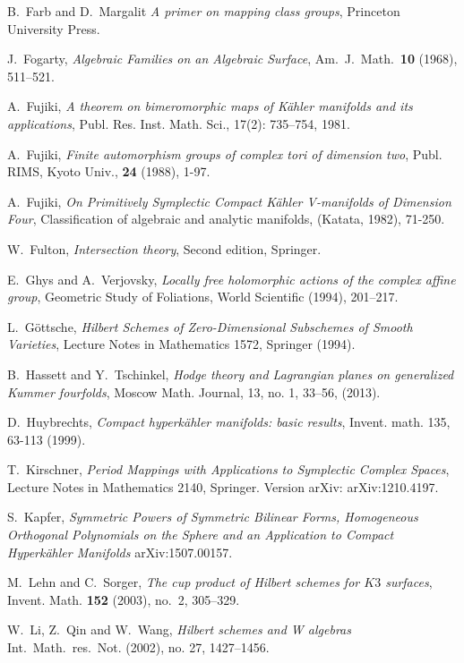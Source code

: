 \begin{thebibliography}{10}
B.~Farb and D.~Margalit \emph{A primer on mapping class groups}, Princeton University Press.

J.~Fogarty, \emph{Algebraic Families on an Algebraic Surface},
  Am.~J.~Math.~\textbf{10} (1968), 511--521.

A.~Fujiki,
\emph{A theorem on bimeromorphic maps of K\"ahler manifolds and its applications},
Publ. Res. Inst. Math. Sci., 
17(2): 735--754, 1981.

A.~Fujiki, \emph{Finite automorphism groups of complex tori of dimension two}, Publ. RIMS,
  Kyoto Univ., \textbf{24} (1988), 1-97.

A.~Fujiki,
\emph{On Primitively Symplectic Compact K\"ahler V-manifolds of Dimension Four},
Classification of algebraic and analytic manifolds, 
(Katata, 1982), 71-250.

W.~Fulton,
\emph{Intersection theory},
Second edition, Springer.

E.~Ghys and A.~Verjovsky, \emph{Locally free holomorphic actions of the complex affine group},
  Geometric Study of Foliations, World Scientific (1994), 201--217.

L.~G\"ottsche, \emph{Hilbert Schemes of Zero-Dimensional Subschemes of Smooth Varieties},
  Lecture Notes in Mathematics 1572, Springer (1994).

B.~Hassett and Y.~Tschinkel, \emph{ Hodge theory and Lagrangian planes on 
  generalized Kummer fourfolds}, Moscow Math. Journal, 13, no. 1, 33--56, (2013).

D.~Huybrechts,
\emph{ Compact hyperk\"ahler manifolds: basic results},
Invent. math. 
135, 63-113 (1999).

T.~Kirschner, 
\emph{Period Mappings with Applications to Symplectic Complex Spaces},
Lecture Notes in Mathematics 2140, Springer.
Version arXiv: arXiv:1210.4197.
  
S.~Kapfer, \emph{Symmetric Powers of Symmetric Bilinear Forms, Homogeneous Orthogonal Polynomials 
  on the Sphere and an Application to Compact Hyperk\"ahler Manifolds} arXiv:1507.00157.
  
M.~Lehn and C.~Sorger, \emph{The cup product of Hilbert schemes for {$K3$}
  surfaces}, Invent. Math. \textbf{152} (2003), no.~2, 305--329.

W.~Li, Z.~Qin and W.~Wang, \emph{Hilbert schemes and W algebras} Int.~Math.~res.~Not. (2002),
  no. 27, 1427--1456.


\end{thebibliography}
